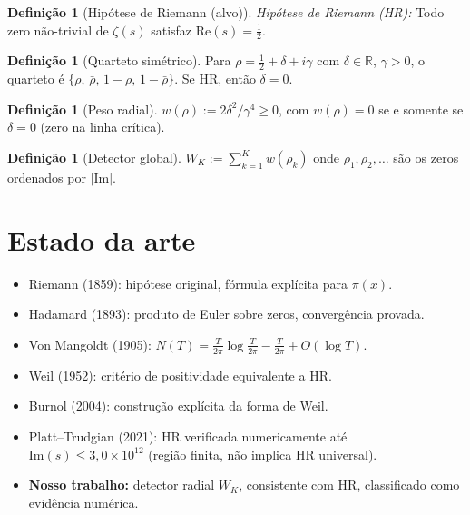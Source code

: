 \documentclass[12pt,a4paper]{article}
\theoremstyle{definition}
\newtheorem{definition}[theorem]{Defini\c{c}\~ao}
\begin{document}
\begin{definition}[Hipótese de Riemann (alvo)]
\emph{Hipótese de Riemann (HR):} Todo zero não-trivial de $\zeta(s)$
satisfaz $\mathrm{Re}(s) = \tfrac{1}{2}$.
\end{definition}

\begin{definition}[Quarteto simétrico]
Para $\rho = \tfrac{1}{2} + \delta + i\gamma$ com $\delta \in \mathbb{R}$,
$\gamma > 0$, o quarteto é
$\{\rho,\, \bar\rho,\, 1-\rho,\, 1-\bar\rho\}$.
Se HR, então $\delta = 0$.
\end{definition}

\begin{definition}[Peso radial]
$w(\rho) := 2\delta^2 / \gamma^4 \ge 0$,
com $w(\rho) = 0$ se e somente se $\delta = 0$ (zero na linha crítica).
\end{definition}

\begin{definition}[Detector global]
$W_K := \sum_{k=1}^{K} w(\rho_k)$
onde $\rho_1, \rho_2, \ldots$ são os zeros ordenados por $|\mathrm{Im}|$.
\end{definition}

\section{Estado da arte}\label{sec:arte}

\begin{itemize}
  \item Riemann (1859): hipótese original, fórmula explícita para $\pi(x)$.
  \item Hadamard (1893): produto de Euler sobre zeros, convergência provada.
  \item Von Mangoldt (1905): $N(T) = \frac{T}{2\pi}\log\frac{T}{2\pi}
        - \frac{T}{2\pi} + O(\log T)$.
  \item Weil (1952): critério de positividade equivalente a HR.
  \item Burnol (2004): construção explícita da forma de Weil.
  \item Platt--Trudgian (2021): HR verificada numericamente até
        $\mathrm{Im}(s) \le 3{,}0 \times 10^{12}$
        (região finita, não implica HR universal).
  \item \textbf{Nosso trabalho:} detector radial $W_K$, consistente com HR,
        classificado como evidência numérica.
\end{itemize}
\end{document}
